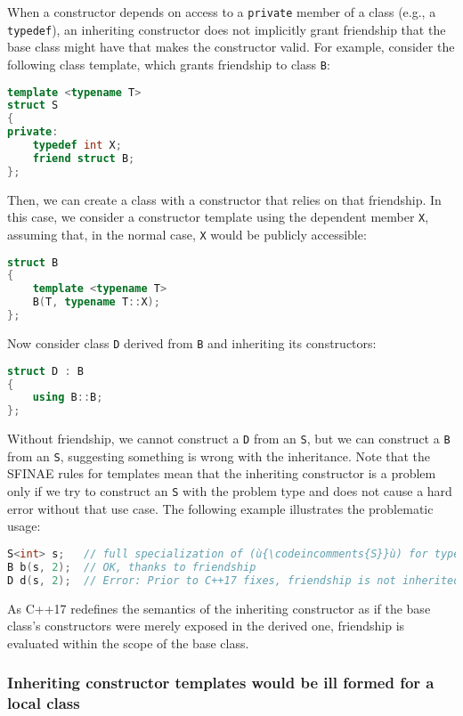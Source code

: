 When a constructor depends on access to a \texttt{private} member of a class (e.g., a \texttt{typedef}), an inheriting constructor does not implicitly grant friendship that the base class might have that makes the constructor valid. For example, consider the following class template, which grants friendship to class \texttt{B}:
\begin{lstlisting}[language=C++]
template <typename T>
struct S
{
private:
    typedef int X;
    friend struct B;
};
\end{lstlisting}
    Then, we can create a class with a constructor that relies on that friendship. In this case, we consider a constructor template using the dependent member \texttt{X}, assuming that, in the normal case, \texttt{X} would be publicly accessible:
\begin{lstlisting}[language=C++]
struct B
{
    template <typename T>
    B(T, typename T::X);
};
\end{lstlisting}
    Now consider class \texttt{D} derived from \texttt{B} and inheriting its constructors:
\begin{lstlisting}[language=C++]
struct D : B
{
    using B::B;
};
\end{lstlisting}
    Without friendship, we cannot construct a \texttt{D} from an \texttt{S}, but we can construct a \texttt{B} from an \texttt{S}, suggesting something is wrong with the inheritance. Note that the SFINAE rules for templates mean that the inheriting constructor is a problem only if we try to construct an \texttt{S} with the problem type and does not cause a hard error without that use case. The following example illustrates the problematic usage:
\begin{lstlisting}[language=C++]
S<int> s;   // full specialization of (ù{\codeincomments{S}}ù) for type (ù{\codeincomments{int}}ù)
B b(s, 2);  // OK, thanks to friendship
D d(s, 2);  // Error: Prior to C++17 fixes, friendship is not inherited.
\end{lstlisting}
    As C++17 redefines the semantics of the inheriting constructor as if the base class’s constructors were merely exposed in the derived one, friendship is evaluated within the scope of the base class.
    
\subsubsection[Inheriting constructor templates would be ill formed for a local class]{Inheriting constructor templates would be ill formed for a local class}

